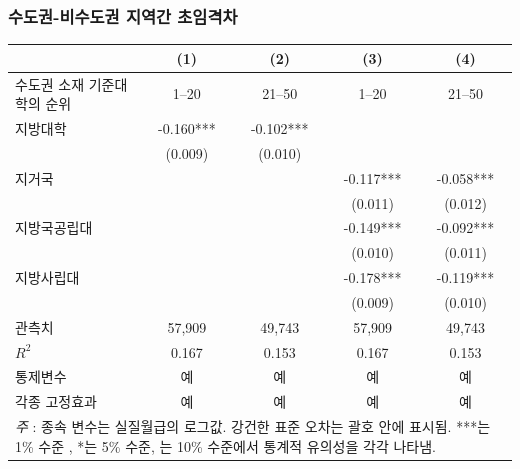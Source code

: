 \documentclass[aspectratio=169,xcolor=dvipsnames,handout]{beamer}
\begin{document}
\begin{frame}
    \frametitle{수도권-비수도권 지역간 초임격차}
    \begin{table}[ht]
        \centering
        \tiny
        \begin{tabular}{lcccc}
        \toprule
                                                   & \textbf{(1)} & \textbf{(2)} & \textbf{(3)} & \textbf{(4)} \\
        \midrule
         수도권 소재 기준대학의 순위 & 1--20     & 21--50    & 1--20     & 21--50    \\
        \midrule
        지방대학                       & -0.160*** & -0.102*** &           &           \\
                                                   & (0.009)   & (0.010)   &           &           \\
        지거국                                       &           &           & -0.117*** & -0.058*** \\
                                                   &           &           & (0.011)   & (0.012)   \\
        지방국공립대                &           &           & -0.149*** & -0.092*** \\
                                                   &           &           & (0.010)   & (0.011)   \\
        지방사립대               &           &           & -0.178*** & -0.119*** \\
                                                   &           &           & (0.009)   & (0.010)   \\
        \midrule                                    
        관측치                               & 57,909    & 49,743    & 57,909    & 49,743    \\
        $R^2$                                  & 0.167     & 0.153     & 0.167     & 0.153     \\
        통제변수                                   & 예       & 예       & 예       & 예       \\
        각종 고정효과                                        & 예       & 예       & 예       & 예       \\
        \bottomrule
        \multicolumn{5}{p{8cm}}{\tiny\textit{주} : 종속 변수는 실질월급의 로그값. 강건한 표준 오차는 괄호 안에 표시됨. ***는 1\% 수준 , *는 5\% 수준, 는 10\% 수준에서 통계적 유의성을 각각 나타냄.} \\
        \end{tabular}
    \end{table}
\end{frame}
\end{document}
